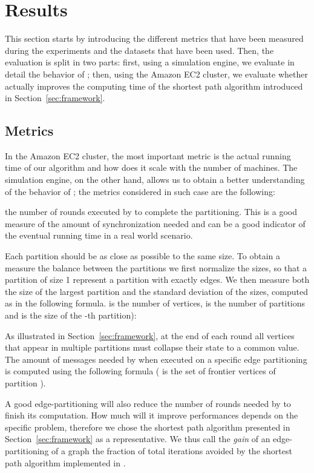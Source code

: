 \section{Results} \label{sec:results}

This section starts by introducing the different metrics that have been
measured during the experiments and the datasets that have been used. Then, the
evaluation is split in two parts: first, using a simulation engine, we evaluate
in detail the behavior of \dfep; then, using the Amazon EC2 cluster, we
evaluate whether \etsch actually improves the computing time of the shortest
path algorithm introduced in Section~\ref{sec:framework}.

\subsection{Metrics}

In the Amazon EC2 cluster, the most important metric is the actual running time
of our algorithm and how does it scale with the number of machines. The simulation
engine, on the other hand, allows us to obtain a better understanding of the
behavior of \dfep; the metrics considered in such case are the following:

 the number of rounds executed by \dfep to complete
the partitioning. This is a good measure of the amount of synchronization
needed and can be a good indicator of the eventual running time in a real world
scenario.

 Each partition should be as close as possible to the same 
size. To obtain a measure the balance between the partitions we first normalize 
the sizes, so that a partition of size 1 represent a partition with exactly  edges. We then measure both the size of the largest partition and the standard 
deviation of the sizes, computed as in the following formula.  is the number of 
vertices,  is the number of partitions and  is the size of the -th 
partition):


 As illustrated in Section~\ref{sec:framework}, at
the end of each round all vertices that appear in multiple partitions must
collapse their state to a common value. The amount of messages needed by \etsch
when executed on a specific edge partitioning is computed using the following
formula ( is the set of frontier vertices of partition ).


 A good edge-partitioning will also reduce the number
of rounds needed by \etsch to finish its computation. How much will it improve
\etsch performances depends on the specific problem, therefore we chose the
shortest path algorithm presented in Section~\ref{sec:framework} as a
representative. We thus call the \emph{gain} of an edge-partitioning of a graph
the fraction of total iterations avoided by the shortest path algorithm implemented
in \etsch.

